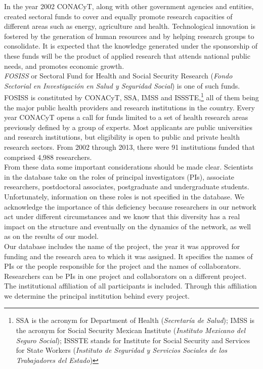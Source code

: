 \documentclass{bmcart}
\begin{document}
In the year 2002 CONACyT, along with other government agencies and
entities, created sectoral funds
to cover and equally
promote research capacities of different areas such as energy, agriculture
and health. Technological innovation is fostered by the generation of human resources
and by helping research groups to consolidate. It is expected that the
knowledge generated under the sponsorship of these funds
will be the product of applied research that attends national public
needs, and promotes economic growth.\\

\emph{FOSISS} or Sectoral Fund for Health and Social Security Research
(\emph{Fondo Sectorial en Investigaci\'on en Salud y Seguridad Social}) is one of
such funds. FOSISS is constituted by CONACyT, SSA, IMSS and ISSSTE,\footnote{SSA
  is the acronym for Department of Health (\emph{Secretar\'ia de Salud}); IMSS is
  the acronym for Social Security Mexican Institute (\emph{Instituto Mexicano
    del Seguro Social}); ISSSTE stands for Institute for Social Security and
  Services for State Workers (\emph{Instituto de Seguridad y Servicios Sociales
    de los Trabajadores del Estado})} all of them being the major public health
providers and research institutions in the country. Every year CONACyT opens a
call for funds limited to a set of health research areas previously defined by a
group of experts. Most applicants are public universities and research
institutions, but eligibility is open to public and private health research sectors.
From 2002 through 2013, there were 91 institutions funded that
comprised 4,988 researchers.\\ 

From these data some important considerations should be made
clear. Scientists in the database take on the roles of principal
investigators (PIs), associate researchers, postdoctoral associates,
postgraduate and undergraduate students.
Unfortunately, information on these roles is not specified in the database.
We acknowledge the importance of this deficiency because
researchers in our network act under different circumstances and we know
that this diversity has a real impact on the structure and eventually on the
dynamics of the network, as well as on the results of our model.\\  

Our database includes the
name of the project, the year it was approved for funding and the research area
to which it was assigned. It specifies the names of PIs or the people 
responsible for the project and the names of collaborators.
Researchers can be PIs in one project and collaborators on a different project. The institutional
affiliation of all participants is included. Through this affiliation
we determine the principal institution
behind every project.\\ 
\end{document}
